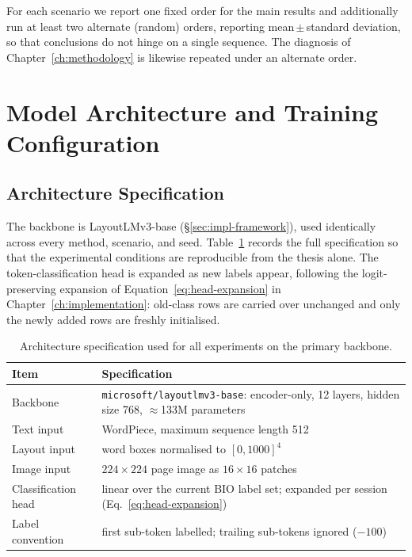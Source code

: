 For each scenario we report one fixed order for the main results and additionally
run at least two alternate (random) orders, reporting mean\,$\pm$\,standard
deviation, so that conclusions do not hinge on a single sequence. The diagnosis of
Chapter~\ref{ch:methodology} is likewise repeated under an alternate order.

\section{Model Architecture and Training Configuration}
\label{sec:exp-config}

\subsection{Architecture Specification}
\label{sec:exp-arch}

The backbone is LayoutLMv3-base (\S\ref{sec:impl-framework}), used identically
across every method, scenario, and seed. Table~\ref{tab:arch-spec} records the
full specification so that the experimental conditions are reproducible from the
thesis alone. The token-classification head is expanded as new labels appear,
following the logit-preserving expansion of Equation~\eqref{eq:head-expansion}
in Chapter~\ref{ch:implementation}: old-class rows are carried over unchanged and
only the newly added rows are freshly initialised.

\begin{table}[!htbp]
  \centering
  \caption[Architecture specification]{Architecture specification used for all
  experiments on the primary backbone.}
  \label{tab:arch-spec}
  \begin{tabular}{lp{8.6cm}}
    \toprule
    \textbf{Item} & \textbf{Specification} \\
    \midrule
    Backbone & \texttt{microsoft/layoutlmv3-base}: encoder-only, 12 layers,
               hidden size 768, $\approx$133M parameters \\
    Text input & WordPiece, maximum sequence length 512 \\
    Layout input & word boxes normalised to $[0,1000]^4$ \\
    Image input & $224\times224$ page image as $16\times16$ patches \\
    Classification head & linear over the current BIO label set; expanded per
               session (Eq.~\ref{eq:head-expansion}) \\
    Label convention & first sub-token labelled; trailing sub-tokens ignored
               ($-100$) \\
    \bottomrule
  \end{tabular}
\end{table}

